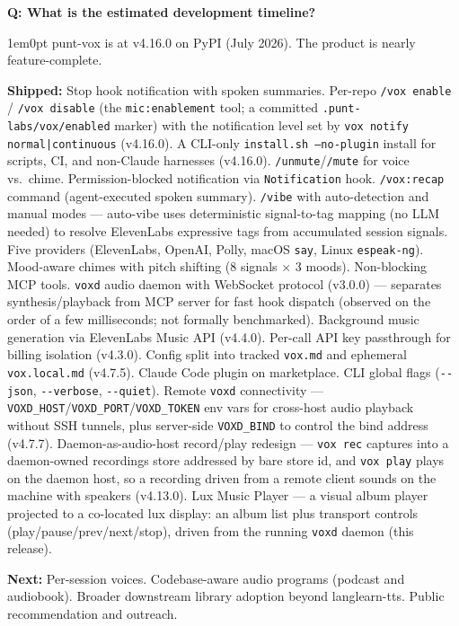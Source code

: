 \documentclass[11pt,letterpaper]{article}
\newcounter{faqnum}
\newenvironment{faqpair}[1]{%
  \needspace{4\baselineskip}%
  \vspace{0.5em}%
  \refstepcounter{faqnum}%
  \noindent\textbf{\color{SectionBlue}Q\thefaqnum: #1}\par\nopagebreak[4]%
  \vspace{0.2em}%
  \begin{adjustwidth}{1em}{0pt}%
  \setlength{\parindent}{0pt}%
}{%
  \end{adjustwidth}%
  \vspace{0.5em}%
}
\begin{document}
\begin{faqpair}{What is the estimated development timeline?}\label{faq:timeline}
  punt-vox is at v4.16.0 on PyPI (July 2026). The product is nearly
  feature-complete.

  \textbf{Shipped:} Stop hook notification with spoken summaries.
  Per-repo \texttt{/vox enable} / \texttt{/vox disable} (the \texttt{mic:enablement}
  tool; a committed \texttt{.punt-labs/vox/enabled} marker) with the
  notification level set by \texttt{vox notify normal|continuous} (v4.16.0).
  A CLI-only \texttt{install.sh --no-plugin} install for scripts, CI, and
  non-Claude harnesses (v4.16.0). \texttt{/unmute}/\texttt{/mute} for voice
  vs.\ chime. Permission-blocked notification via \texttt{Notification}
  hook. \texttt{/vox:recap} command (agent-executed spoken summary).
  \texttt{/vibe} with auto-detection and manual modes --- auto-vibe uses
  deterministic signal-to-tag mapping (no LLM needed) to resolve
  ElevenLabs expressive tags from accumulated session signals.
  Five providers (ElevenLabs, OpenAI, Polly, macOS \texttt{say}, Linux
  \texttt{espeak-ng}). Mood-aware chimes with pitch shifting
  (8 signals $\times$ 3 moods). Non-blocking MCP tools.
  \texttt{voxd} audio daemon with WebSocket protocol (v3.0.0) ---
  separates synthesis/playback from MCP server for fast hook dispatch
  (observed on the order of a few milliseconds; not formally benchmarked).
  Background music generation via ElevenLabs Music API (v4.4.0).
  Per-call API key passthrough for billing isolation (v4.3.0).
  Config split into tracked \texttt{vox.md} and ephemeral
  \texttt{vox.local.md} (v4.7.5).
  Claude Code plugin on marketplace. CLI global flags
  (\texttt{-{}-json}, \texttt{-{}-verbose}, \texttt{-{}-quiet}).
  Remote \texttt{voxd} connectivity ---
  \texttt{VOXD\_HOST}/\texttt{VOXD\_PORT}/\texttt{VOXD\_TOKEN} env vars
  for cross-host audio playback without SSH tunnels, plus server-side
  \texttt{VOXD\_BIND} to control the bind address (v4.7.7).
  Daemon-as-audio-host record/play redesign --- \texttt{vox rec} captures into
  a daemon-owned recordings store addressed by bare store id, and \texttt{vox
  play} plays on the daemon host, so a recording driven from a remote client
  sounds on the machine with speakers (v4.13.0).
  Lux Music Player --- a visual album player projected to a co-located lux
  display: an album list plus transport controls (play/pause/prev/next/stop),
  driven from the running \texttt{voxd} daemon (this release).

  \textbf{Next:} Per-session voices. Codebase-aware audio programs (podcast and
  audiobook). Broader downstream library adoption beyond langlearn-tts. Public
  recommendation and outreach.
\end{faqpair}
\end{document}

